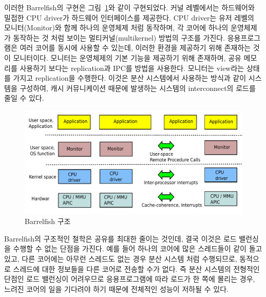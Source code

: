 이러한 Barrelfish의 구현은 그림~\ref{fig:Barrelfish}와 같이 구현되었다.
커널 레벨에서는 하드웨어와 밀접한 CPU driver가 하드웨어 인터페이스를 제공한다.
CPU driver는 유저 레벨의 모니터(Monitor)와 함께 하나의 운영체제 처럼 동작하며, 
각 코어에 하나의 운영체제가 동작하는 것 처럼 보이는 멀티커널(multikernel) 방법의 구조를 가진다. 
응용프로그램은 여러 코어를 동시에 사용할 수 있는데, 이러한 환경을 제공하기 위해 존재하는 것이 
모니터이다. 
모니터는 운영체제의 기본 기능을 제공하기 위해 존재하며, 공유 메모리를 사용하기 
보다는 replication과 IPC를 방법을 사용한다. 
모니터는 view라는 상태를 가지고 replication을 수행한다. 
이것은 분산 시스템에서 사용하는 방식과 같이 시스템을 구성하여, 캐시 커뮤니케이션 때문에 발생하는 
시스템의 interconnect의 로드를 줄일 수 있다.

\begin{figure}[h!]
    \centering
    \includegraphics[width=1\textwidth]{fig/multikernel/multikernel}
    \caption{Barrelfish 구조}
  \label{fig:Barrelfish}
\end{figure}

Barrelfish의 구조적인 철학은 공유를 최대한 줄이는 것인데, 결국 이것은 로드 밸런싱을 수행할 수 
없는 단점을 가진다. 
예를 들어 하나의 코어에 많은 스레드들이 같이 돌고 있고, 다른 코어에는 아무런 
스레드도 없는 경우 분산 시스템 처럼 수행되므로, 동적으로 스레드에 대한 정보들을 
다른 코어로 전송할 수가 없다.
즉 분산 시스템의 전형적인 단점인 로드 밸런싱이 어려우므로 응용프로그램에 따라 
로드가 한 쪽에 몰리는 경우, 느려진 코어의 일을 기다려야 하기 때문에 전체적인 
성능이 저하될 수 있다. 

